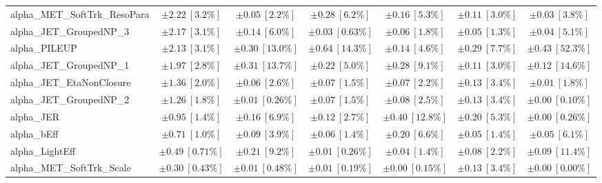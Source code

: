 \begin{sidewaystable}
\begin{center}
\begin{tabular*}{\textwidth}{@{\extracolsep{\fill}}lcccccc}
alpha\_MET\_SoftTrk\_ResoPara         & $\pm 2.22\ [3.2\%] $          & $\pm 0.05\ [2.2\%] $          & $\pm 0.28\ [6.2\%] $          & $\pm 0.16\ [5.3\%] $          & $\pm 0.11\ [3.0\%] $          & $\pm 0.03\ [3.8\%] $       \\
alpha\_JET\_GroupedNP\_3         & $\pm 2.17\ [3.1\%] $          & $\pm 0.14\ [6.0\%] $          & $\pm 0.03\ [0.63\%] $          & $\pm 0.06\ [1.8\%] $          & $\pm 0.05\ [1.3\%] $          & $\pm 0.04\ [5.1\%] $       \\
alpha\_PILEUP         & $\pm 2.13\ [3.1\%] $          & $\pm 0.30\ [13.0\%] $          & $\pm 0.64\ [14.3\%] $          & $\pm 0.14\ [4.6\%] $          & $\pm 0.29\ [7.7\%] $          & $\pm 0.43\ [52.3\%] $       \\
alpha\_JET\_GroupedNP\_1         & $\pm 1.97\ [2.8\%] $          & $\pm 0.31\ [13.7\%] $          & $\pm 0.22\ [5.0\%] $          & $\pm 0.28\ [9.1\%] $          & $\pm 0.11\ [3.0\%] $          & $\pm 0.12\ [14.6\%] $       \\
alpha\_JET\_EtaNonClosure         & $\pm 1.36\ [2.0\%] $          & $\pm 0.06\ [2.6\%] $          & $\pm 0.07\ [1.5\%] $          & $\pm 0.07\ [2.2\%] $          & $\pm 0.13\ [3.4\%] $          & $\pm 0.01\ [1.8\%] $       \\
alpha\_JET\_GroupedNP\_2         & $\pm 1.26\ [1.8\%] $          & $\pm 0.01\ [0.26\%] $          & $\pm 0.07\ [1.5\%] $          & $\pm 0.08\ [2.5\%] $          & $\pm 0.13\ [3.4\%] $          & $\pm 0.00\ [0.10\%] $       \\
alpha\_JER         & $\pm 0.95\ [1.4\%] $          & $\pm 0.16\ [6.9\%] $          & $\pm 0.12\ [2.7\%] $          & $\pm 0.40\ [12.8\%] $          & $\pm 0.20\ [5.3\%] $          & $\pm 0.00\ [0.26\%] $       \\
alpha\_bEff         & $\pm 0.71\ [1.0\%] $          & $\pm 0.09\ [3.9\%] $          & $\pm 0.06\ [1.4\%] $          & $\pm 0.20\ [6.6\%] $          & $\pm 0.05\ [1.4\%] $          & $\pm 0.05\ [6.1\%] $       \\
alpha\_LightEff         & $\pm 0.49\ [0.71\%] $          & $\pm 0.21\ [9.2\%] $          & $\pm 0.01\ [0.26\%] $          & $\pm 0.04\ [1.4\%] $          & $\pm 0.08\ [2.2\%] $          & $\pm 0.09\ [11.4\%] $       \\
alpha\_MET\_SoftTrk\_Scale         & $\pm 0.30\ [0.43\%] $          & $\pm 0.01\ [0.48\%] $          & $\pm 0.01\ [0.19\%] $          & $\pm 0.00\ [0.15\%] $          & $\pm 0.13\ [3.4\%] $          & $\pm 0.00\ [0.00\%] $       \\

\end{tabular*}
\end{center}
\end{sidewaystable}
